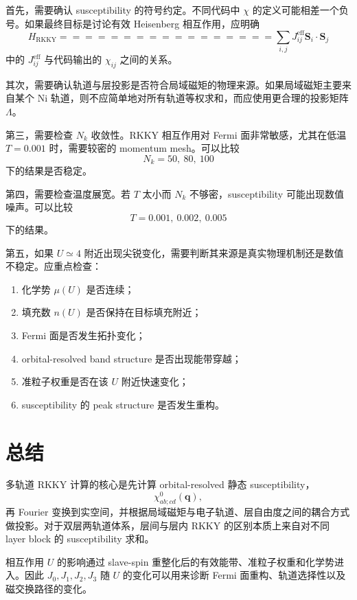 \documentclass[UTF8,11pt]{ctexart}
\begin{document}
首先，需要确认 susceptibility 的符号约定。不同代码中 $\chi$ 的定义可能相差一个负号。如果最终目标是讨论有效 Heisenberg 相互作用，应明确
\begin{equation}
    H_{\mathrm{RKKY}}
    =================

    \sum_{i,j}
    J_{ij}^{\mathrm{eff}}
    \mathbf S_i\cdot \mathbf S_j
\end{equation}
中的 $J_{ij}^{\mathrm{eff}}$ 与代码输出的 $\chi_{ij}$ 之间的关系。

其次，需要确认轨道与层投影是否符合局域磁矩的物理来源。如果局域磁矩主要来自某个 Ni 轨道，则不应简单地对所有轨道等权求和，而应使用更合理的投影矩阵 $\Lambda$。

第三，需要检查 $N_k$ 收敛性。RKKY 相互作用对 Fermi 面非常敏感，尤其在低温 $T=0.001$ 时，需要较密的 momentum mesh。可以比较
\begin{equation}
    N_k=50,\ 80,\ 100
\end{equation}
下的结果是否稳定。

第四，需要检查温度展宽。若 $T$ 太小而 $N_k$ 不够密，susceptibility 可能出现数值噪声。可以比较
\begin{equation}
    T=0.001,\ 0.002,\ 0.005
\end{equation}
下的结果。

第五，如果 $U\simeq 4$ 附近出现尖锐变化，需要判断其来源是真实物理机制还是数值不稳定。应重点检查：
\begin{enumerate}
    \item 化学势 $\mu(U)$ 是否连续；
    \item 填充数 $n(U)$ 是否保持在目标填充附近；
    \item Fermi 面是否发生拓扑变化；
    \item orbital-resolved band structure 是否出现能带穿越；
    \item 准粒子权重是否在该 $U$ 附近快速变化；
    \item susceptibility 的 peak structure 是否发生重构。
\end{enumerate}

\section{总结}

多轨道 RKKY 计算的核心是先计算 orbital-resolved 静态 susceptibility，
\begin{equation}
    \chi^{0}_{ab;cd}(\mathbf q),
\end{equation}
再 Fourier 变换到实空间，并根据局域磁矩与电子轨道、层自由度之间的耦合方式做投影。对于双层两轨道体系，层间与层内 RKKY 的区别本质上来自对不同 layer block 的 susceptibility 求和。

相互作用 $U$ 的影响通过 slave-spin 重整化后的有效能带、准粒子权重和化学势进入。因此 $J_0,J_1,J_2,J_3$ 随 $U$ 的变化可以用来诊断 Fermi 面重构、轨道选择性以及磁交换路径的变化。
\end{document}
